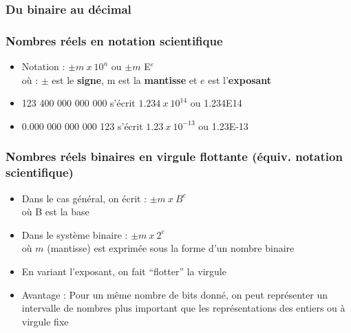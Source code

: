 \documentclass{beamer}
\begin{document}
\begin{frame}
\frametitle{Du binaire au décimal}

\end{frame}

\begin{frame}
  \frametitle{Nombres réels en notation scientifique}
  \begin{itemize}
  \item Notation : $\pm m~x~10^n$ ou $\pm m$ E$^e$\\
    où : $\pm$ est le \textbf{signe}, m est la \textbf{mantisse} et $e$
    est l'\textbf{exposant}
  \item 123 400 000 000 000 s'écrit $1.234~x~10^{14}$ ou 1.234E14
  \item 0.000 000 000 000 123 s'écrit $1.23~x~10^{-13}$ ou 1.23E-13
  \end{itemize}
\end{frame}


\begin{frame}
  \frametitle{Nombres réels binaires en virgule flottante
    (équiv. notation scientifique)}
  \begin{itemize}
  \item Dans le cas général, on écrit : $\pm m~x~B^e$\\ où \textcolor{Mycolor1}{B est la base}
  \item Dans le système binaire : $\pm m~x~2^e$\\ où \textcolor{Mycolor2}{$m$ (mantisse)} est
    exprimée \textcolor{Mycolor1}{sous la forme d'un nombre binaire}
  \item En variant \textcolor{Mycolor1}{l'exposant, on fait ``flotter'' la virgule}
  \item Avantage : Pour un même nombre de bits donné, \textcolor{Mycolor1}{on peut
    représenter un intervalle de nombres plus important} que les
    représentations des entiers ou à virgule fixe
  \end{itemize}  
\end{frame}
\end{document}
